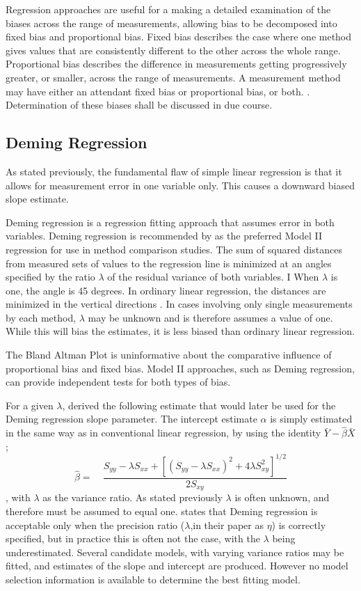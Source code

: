 \documentclass[12pt, a4paper]{report}
\theoremstyle{plain}
\theoremstyle{definition}
\theoremstyle{remark}
\begin{document}
Regression approaches are useful for a making a detailed examination of the biases across the range of measurements, allowing bias to be decomposed into fixed bias and proportional bias.
Fixed bias describes the case where one method gives values that are consistently different
to the other across the whole range. Proportional
bias describes the difference in measurements getting progressively greater, or smaller, across the range of measurements. A measurement method may have either an attendant fixed bias or proportional bias, or both. \citep{ludbrook}. Determination of these biases shall be discussed in due course.


\subsection{Deming Regression}

As stated previously, the fundamental flaw of simple linear regression is that it allows for measurement error in one variable only. This causes a downward biased slope estimate.

Deming regression is a regression fitting approach that assumes error in both variables. Deming regression is recommended by \citet*{CornCoch} as the
preferred Model II regression for use in method comparison
studies.
The sum of squared distances from measured sets of values to the regression line is minimized at an angles specified by the ratio $\lambda$ of the residual variance of both variables. I
When $\lambda$ is one, the angle is 45 degrees. In ordinary linear regression, the distances are minimized in the vertical directions \citep{linnet99}.
In cases involving only single measurements by each method, $\lambda$ may be unknown and is therefore assumes a value of one. While this will bias the estimates, it is less biased than ordinary linear regression.

The Bland Altman Plot is
uninformative about the comparative influence of proportional bias
and fixed bias. Model II approaches, such as Deming regression,  can provide independent tests for
both types of bias.

For a given $\lambda$, \citet{Kummel} derived the following
estimate that would later be used for the Deming regression slope
parameter. The intercept estimate $\alpha$
is simply estimated in the same way as in conventional linear
regression, by using the identity $\bar{Y}-\hat{\beta}\bar{X}$;
\begin{equation}
\hat{\beta} =\quad \frac{S_{yy} - \lambda S_{xx}+[(S_{yy} -
	\lambda S_{xx})^{2}+ 4\lambda S^{2}_{xy}]^{1/2}}{2S_{xy}}
\end{equation},
with $\lambda$ as the variance ratio. As stated previously $\lambda$ is often unknown, and therefore must be assumed to equal one. \citet{CarollRupert} states that Deming
regression is acceptable only when the precision ratio ($\lambda$,in their paper as $\eta$) is correctly specified, but in practice this is often not the case, with the $\lambda$ being underestimated. Several candidate models, with varying variance ratios may be fitted, and estimates of the slope and intercept are produced. However no model selection information is available to determine the best fitting model.
\end{document}
